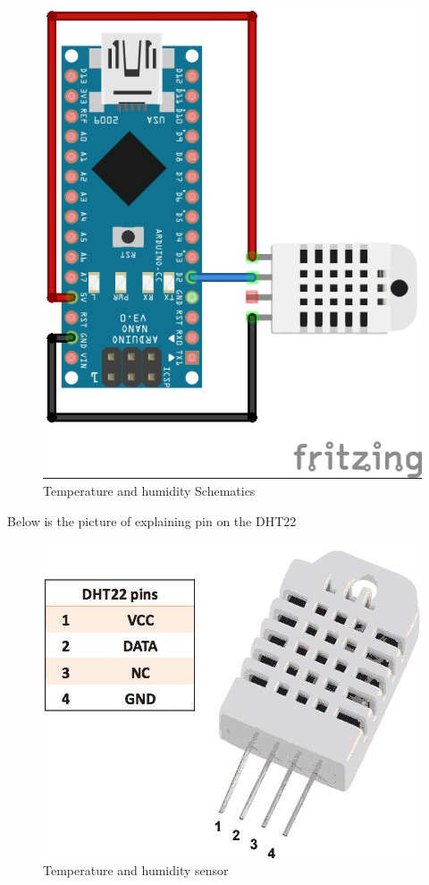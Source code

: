 \documentclass{report}
\begin{document}
\begin{figure}[H]
\begin{center}
\includegraphics[scale=1.25]{images/H&T.jpg}
\caption{Temperature and humidity Schematics}	
\end{center}
\end{figure}

Below is the picture of explaining pin on the DHT22 \\

\begin{figure}[H]
\begin{center}
\includegraphics[scale=0.25]{images/DHT22.jpg}
\caption{Temperature and humidity sensor}
\end{center}
\end{figure}
\end{document}
